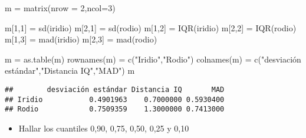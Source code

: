 \documentclass[
]{article}
\newenvironment{Shaded}{\begin{snugshade}}{\end{snugshade}}
\newcommand{\AttributeTok}[1]{\textcolor[rgb]{0.77,0.63,0.00}{#1}}
\newcommand{\DecValTok}[1]{\textcolor[rgb]{0.00,0.00,0.81}{#1}}
\newcommand{\FunctionTok}[1]{\textcolor[rgb]{0.00,0.00,0.00}{#1}}
\newcommand{\NormalTok}[1]{#1}
\newcommand{\OtherTok}[1]{\textcolor[rgb]{0.56,0.35,0.01}{#1}}
\newcommand{\StringTok}[1]{\textcolor[rgb]{0.31,0.60,0.02}{#1}}
\providecommand{\tightlist}{%
  \setlength{\itemsep}{0pt}\setlength{\parskip}{0pt}}
\begin{document}
\begin{Shaded}
\begin{Highlighting}[]
\NormalTok{m }\OtherTok{=} \FunctionTok{matrix}\NormalTok{(}\AttributeTok{nrow =} \DecValTok{2}\NormalTok{,}\AttributeTok{ncol=}\DecValTok{3}\NormalTok{)}

\NormalTok{m[}\DecValTok{1}\NormalTok{,}\DecValTok{1}\NormalTok{] }\OtherTok{=} \FunctionTok{sd}\NormalTok{(iridio)}
\NormalTok{m[}\DecValTok{2}\NormalTok{,}\DecValTok{1}\NormalTok{] }\OtherTok{=} \FunctionTok{sd}\NormalTok{(rodio)}
\NormalTok{m[}\DecValTok{1}\NormalTok{,}\DecValTok{2}\NormalTok{] }\OtherTok{=} \FunctionTok{IQR}\NormalTok{(iridio)}
\NormalTok{m[}\DecValTok{2}\NormalTok{,}\DecValTok{2}\NormalTok{] }\OtherTok{=} \FunctionTok{IQR}\NormalTok{(rodio)}
\NormalTok{m[}\DecValTok{1}\NormalTok{,}\DecValTok{3}\NormalTok{] }\OtherTok{=} \FunctionTok{mad}\NormalTok{(iridio)}
\NormalTok{m[}\DecValTok{2}\NormalTok{,}\DecValTok{3}\NormalTok{] }\OtherTok{=} \FunctionTok{mad}\NormalTok{(rodio)}

\NormalTok{m }\OtherTok{=} \FunctionTok{as.table}\NormalTok{(m)}
\FunctionTok{rownames}\NormalTok{(m) }\OtherTok{=} \FunctionTok{c}\NormalTok{(}\StringTok{"Iridio"}\NormalTok{,}\StringTok{"Rodio"}\NormalTok{)}
\FunctionTok{colnames}\NormalTok{(m) }\OtherTok{=} \FunctionTok{c}\NormalTok{(}\StringTok{"desviación estándar"}\NormalTok{,}\StringTok{"Distancia IQ"}\NormalTok{,}\StringTok{"MAD"}\NormalTok{)}
\NormalTok{m}
\end{Highlighting}
\end{Shaded}

\begin{verbatim}
##        desviación estándar Distancia IQ       MAD
## Iridio           0.4901963    0.7000000 0.5930400
## Rodio            0.7509359    1.3000000 0.7413000
\end{verbatim}

\begin{itemize}
\tightlist
\item
  Hallar los cuantiles 0,90, 0,75, 0,50, 0,25 y 0,10
\end{itemize}
\end{document}
